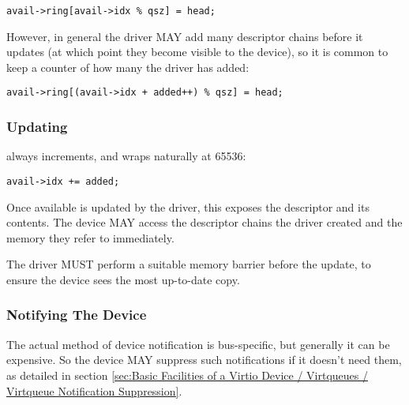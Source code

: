 \begin{lstlisting}
avail->ring[avail->idx % qsz] = head;
\end{lstlisting}

However, in general the driver MAY add many descriptor chains before it updates
 (at which point they become visible to the
device), so it is common to keep a counter of how many the driver has added:

\begin{lstlisting}
avail->ring[(avail->idx + added++) % qsz] = head;
\end{lstlisting}

\subsubsection{Updating }\label{sec:General Initialization And Device Operation / Device Operation / Supplying Buffers to The Device / Updating idx}

 always increments, and wraps naturally at
65536:

\begin{lstlisting}
avail->idx += added;
\end{lstlisting}

Once available  is updated by the driver, this exposes the
descriptor and its contents.  The device MAY
access the descriptor chains the driver created and the
memory they refer to immediately.

The driver MUST perform a suitable memory barrier before the  update, to ensure the
device sees the most up-to-date copy.

\subsubsection{Notifying The Device}\label{sec:General Initialization And Device Operation / Device Operation / Supplying Buffers to The Device / Notifying The Device}

The actual method of device notification is bus-specific, but generally
it can be expensive.  So the device MAY suppress such notifications if it
doesn't need them, as detailed in section \ref{sec:Basic Facilities of a Virtio Device / Virtqueues / Virtqueue Notification Suppression}.

